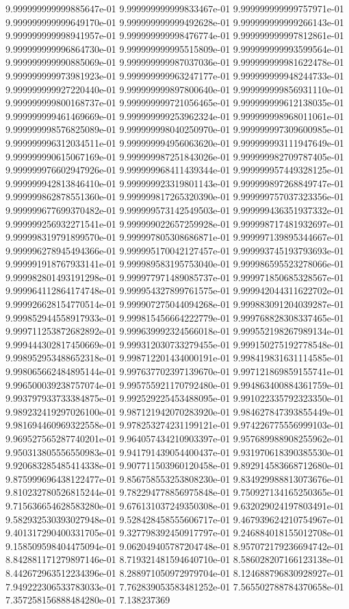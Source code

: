 9.999999999999885647e-01	9.999999999999833467e-01	9.999999999999757971e-01	9.999999999999649170e-01	9.999999999999492628e-01	9.999999999999266143e-01	9.999999999998941957e-01	9.999999999998476774e-01	9.999999999997812861e-01	9.999999999996864730e-01	9.999999999995515809e-01	9.999999999993599564e-01	9.999999999990885069e-01	9.999999999987037036e-01	9.999999999981622478e-01	9.999999999973981923e-01	9.999999999963247177e-01	9.999999999948244733e-01	9.999999999927220440e-01	9.999999999897800640e-01	9.999999999856931110e-01	9.999999999800168737e-01	9.999999999721056465e-01	9.999999999612138035e-01	9.999999999461469669e-01	9.999999999253962324e-01	9.999999998968011061e-01	9.999999998576825089e-01	9.999999998040250970e-01	9.999999997309600985e-01	9.999999996312034511e-01	9.999999994956063620e-01	9.999999993111947649e-01	9.999999990615067169e-01	9.999999987251843026e-01	9.999999982709787405e-01	9.999999976602947926e-01	9.999999968411439344e-01	9.999999957449328125e-01	9.999999942813846410e-01	9.999999923319801143e-01	9.999999897268849747e-01	9.999999862878551360e-01	9.999999817265320390e-01	9.999999757037323356e-01	9.999999677699370482e-01	9.999999573142549503e-01	9.999999436351937332e-01	9.999999256932271541e-01	9.999999022657259928e-01	9.999998717481932697e-01	9.999998319791899570e-01	9.999997805308686871e-01	9.999997139895344667e-01	9.999996278945494366e-01	9.999995170042127457e-01	9.999993745193793693e-01	9.999991918767933141e-01	9.999989583195753040e-01	9.999986595523278066e-01	9.999982801493191298e-01	9.999977971489085737e-01	9.999971850685328567e-01	9.999964112864174748e-01	9.999954327899761575e-01	9.999942044311622702e-01	9.999926628154770514e-01	9.999907275044094268e-01	9.999883091204039287e-01	9.999852944558917933e-01	9.999815456664222779e-01	9.999768828308337465e-01	9.999711253872682892e-01	9.999639992324566018e-01	9.999552198267989134e-01	9.999444302817450669e-01	9.999312030733279455e-01	9.999150275192778548e-01	9.998952953488652318e-01	9.998712201434000191e-01	9.998419831631114585e-01	9.998065662484895144e-01	9.997637702397139670e-01	9.997121869859155741e-01	9.996500039238757074e-01	9.995755921170792480e-01	9.994863400884361759e-01	9.993797933733384875e-01	9.992529225453488095e-01	9.991022335792323350e-01	9.989232419297026100e-01	9.987121942070283920e-01	9.984627847393855449e-01	9.981694460969322558e-01	9.978253274231199121e-01	9.974226775556999103e-01	9.969527565287740201e-01	9.964057434210903397e-01	9.957689988908255962e-01	9.950313805556550983e-01	9.941791439054400437e-01	9.931970618390385530e-01	9.920683285485414338e-01	9.907711503960120458e-01	9.892914583668712680e-01	9.875999696438122477e-01	9.856758553253808230e-01	9.834929988813073676e-01	9.810232780526815244e-01	9.782294778856975848e-01	9.750927134165250365e-01	9.715636654628583280e-01	9.676131037249350308e-01	9.632029024197803491e-01	9.582932530393027948e-01	9.528428458555606717e-01	9.467939624210754967e-01	9.401317290400331705e-01	9.327798392450917797e-01	9.246884018155012708e-01	9.158509598404475094e-01	9.062049405787204748e-01	8.957072179236694742e-01	8.842881171279897146e-01	8.719321481594640710e-01	8.586028207166123138e-01	8.442672963512234396e-01	8.288971050972979704e-01	8.124688796830928927e-01	7.949222306533783033e-01	7.762839053583481252e-01	7.565502788784370658e-01	7.357258156888484280e-01	7.138237369